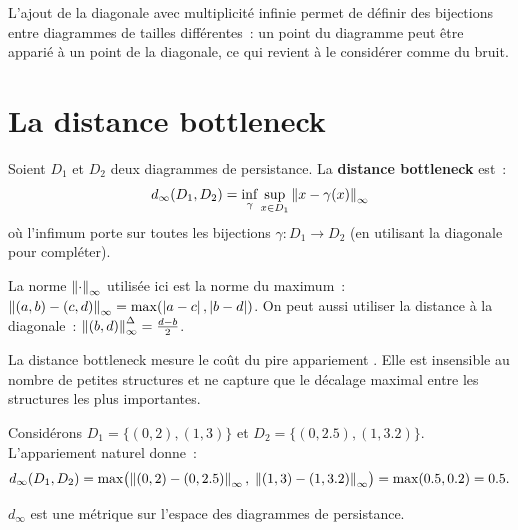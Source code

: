 \begin{remarque}
L'ajout de la diagonale avec multiplicit\'e infinie permet de d\'efinir
des bijections entre diagrammes de tailles diff\'erentes~: un point du
diagramme peut \^etre appari\'e \`a un point de la diagonale, ce qui
revient \`a le consid\'erer comme du bruit.
\end{remarque}

\section{La distance bottleneck}
\label{sec:bottleneck}

\begin{definition}
\label{def:bottleneck}
Soient $D_1$ et $D_2$ deux diagrammes de persistance. La \textbf{distance
bottleneck} est~:
\[
  d_\infty(D_1, D_2) = \inf_{\gamma} \sup_{x \in D_1}
    \left\| x - \gamma(x) \right\|_\infty
\]
o\`u l'infimum porte sur toutes les bijections $\gamma : D_1 \to D_2$
(en utilisant la diagonale pour compl\'eter).
\end{definition}

\begin{remarque}
La norme $\left\| \cdot \right\|_\infty$ utilis\'ee ici est la norme du maximum~:
$\left\| (a,b) - (c,d) \right\|_\infty = \max(\left| a-c \right|, \left| b-d \right|)$.
On peut aussi utiliser la distance \`a la diagonale~:
$\left\| (b,d) \right\|_\infty^{\Delta} = \frac{d - b}{2}$.
\end{remarque}

\begin{intuition}
La distance bottleneck mesure le \og{} co\^ut du pire appariement \fg.
Elle est insensible au nombre de petites structures et ne capture que
le d\'ecalage maximal entre les structures les plus importantes.
\end{intuition}

\begin{exemple}
Consid\'erons $D_1 = \{(0, 2), (1, 3)\}$ et $D_2 = \{(0, 2.5), (1, 3.2)\}$.
L'appariement naturel donne~:
\[
  d_\infty(D_1, D_2) = \max\bigl(\left\| (0,2)-(0,2.5) \right\|_\infty,\;
  \left\| (1,3)-(1,3.2) \right\|_\infty\bigr) = \max(0.5, 0.2) = 0.5.
\]
\end{exemple}

\begin{proposition}[M\'etrique]
$d_\infty$ est une m\'etrique sur l'espace des diagrammes de persistance.
\end{proposition}

